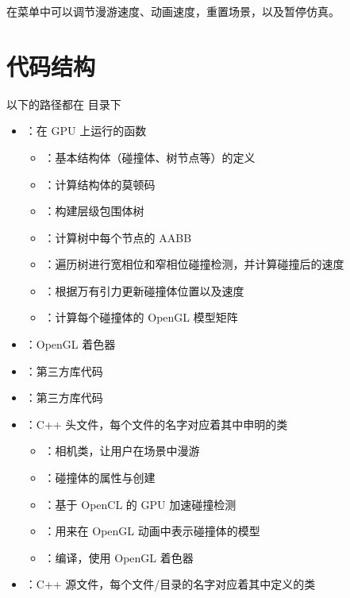 在菜单中可以调节漫游速度、动画速度，重置场景，以及暂停仿真。

\section{代码结构}

以下的路径都在  目录下

\begin{itemize}
    \item {}：在 GPU 上运行的函数
    \begin{itemize}
        \item {}：基本结构体（碰撞体、树节点等）的定义
        \item {}：计算结构体的莫顿码
        \item {}：构建层级包围体树
        \item {}：计算树中每个节点的 AABB
        \item {}：遍历树进行宽相位和窄相位碰撞检测，并计算碰撞后的速度
        \item {}：根据万有引力更新碰撞体位置以及速度
        \item {}：计算每个碰撞体的 OpenGL 模型矩阵
    \end{itemize}
    \item {}：OpenGL 着色器
    \item {}：第三方库代码
    \item {}：第三方库代码
    \item {}：C++ 头文件，每个文件的名字对应着其中申明的类
    \begin{itemize}
        \item {}：相机类，让用户在场景中漫游
        \item {}：碰撞体的属性与创建
        \item {}：基于 OpenCL 的 GPU 加速碰撞检测
        \item {}：用来在 OpenGL 动画中表示碰撞体的模型
        \item {}：编译，使用 OpenGL 着色器
    \end{itemize}
    \item {}：C++ 源文件，每个文件/目录的名字对应着其中定义的类
\end{itemize}

